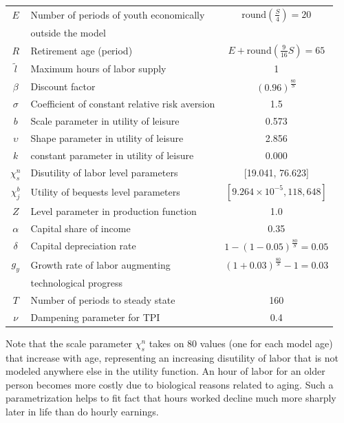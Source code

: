 \documentclass[letterpaper,12pt]{article}
\theoremstyle{definition}
\begin{document}
\begin{spacing}{1.5}
\begin{table}[htbp]
\begin{threeparttable}
\begin{tabular}{>{\footnotesize}c |>{\footnotesize}l |>{\footnotesize}c}
        $E$ & Number of periods of youth economically & $\text{round}\left(\frac{S}{4}\right)=20$ \\[-2mm]
        & \quad outside the model & \\
        $R$ & Retirement age (period) & $E+\text{round}\left(\frac{9}{16}S\right)=65$ \\
        \hline
        $\tilde{l}$ & Maximum hours of labor supply & 1 \\
        $\beta$ & Discount factor & $(0.96)^\frac{80}{S}$ \\
        $\sigma$ & Coefficient of constant relative risk aversion & 1.5 \\
        $b$ & Scale parameter in utility of leisure & 0.573 \\
        $\upsilon$ & Shape parameter in utility of leisure & 2.856 \\
        $k$ & constant parameter in utility of leisure & 0.000 \\
        $\chi^n_s$ & Disutility of labor level parameters & [19.041, 76.623] \\
        $\chi^b_j$ & Utility of bequests level parameters &  $[9.264 \times 10^{-5}, 118,648]$ \\ %
        \hline
        $Z$ & Level parameter in production function & 1.0 \\
        $\alpha$ & Capital share of income & 0.35 \\
        $\delta$ & Capital depreciation rate & $1-(1-0.05)^\frac{80}{S}=0.05$ \\
        $g_y$ & Growth rate of labor augmenting & $(1+0.03)^\frac{80}{S}-1 = 0.03$ \\[-2mm]
        & \quad technological progress & \\
        \hline
        $T$ & Number of periods to steady state & 160 \\
        $\nu$ & Dampening parameter for TPI & 0.4 \\
        \hline\hline
      \end{tabular}
      \end{threeparttable}
    \end{table}

    Note that the scale parameter $\chi^n_s$ takes on 80 values (one for each model age) that increase with age, representing an increasing disutility of labor that is not modeled anywhere else in the utility function. An hour of labor for an older person becomes more costly due to biological reasons related to aging. Such a parametrization helps to fit fact that hours worked decline much more sharply later in life than do hourly earnings.


\end{spacing}
\end{document}
